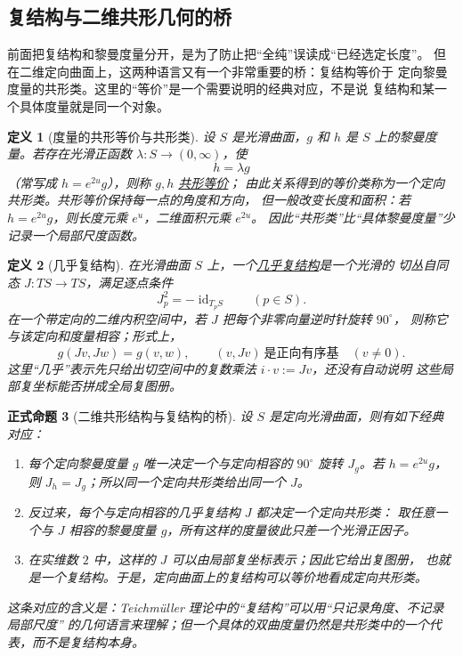 \documentclass[UTF8,fontset=none,a4paper,11pt]{ctexart}
\theoremstyle{foundation-definition}
\newtheorem{definition}{定义}[section]
\theoremstyle{foundation-theorem}
\theoremstyle{foundation-proposition}
\newtheorem{proposition}[definition]{正式命题}
\theoremstyle{foundation-example}
\theoremstyle{foundation-remark}
\theoremstyle{foundation-theorem}
\newcommand{\term}[2]{\hyperref[#1]{#2}}
\begin{document}
\subsection{复结构与二维共形几何的桥}

前面把复结构和黎曼度量分开，是为了防止把“全纯”误读成“已经选定长度”。
但在二维定向曲面上，这两种语言又有一个非常重要的桥：复结构等价于
定向黎曼度量的共形类。这里的“等价”是一个需要说明的经典对应，不是说
复结构和某一个具体度量就是同一个对象。

\begin{definition}[度量的共形等价与共形类]\label{def:conformal-metric-class}
设 \(S\) 是光滑曲面，\(g\) 和 \(h\) 是 \(S\) 上的黎曼度量。若存在光滑正函数
\(\lambda:S\to(0,\infty)\)，使
\[
h=\lambda g
\]
（常写成 \(h=e^{2u}g\)），则称 \(g,h\) \term{def:conformal-metric-class}{共形等价}；
由此关系得到的等价类称为一个定向共形类。共形等价保持每一点的角度和方向，
但一般改变长度和面积：若 \(h=e^{2u}g\)，则长度元乘 \(e^u\)，二维面积元乘 \(e^{2u}\)。
因此“共形类”比“具体黎曼度量”少记录一个局部尺度函数。
\end{definition}

\begin{definition}[几乎复结构]\label{def:almost-complex-structure}
在光滑曲面 \(S\) 上，一个\term{def:almost-complex-structure}{几乎复结构}是一个光滑的
切丛自同态 \(J:TS\to TS\)，满足逐点条件
\[
J_p^2=-\operatorname{id}_{T_pS}\qquad(p\in S).
\]
在一个带定向的二维内积空间中，若 \(J\) 把每个非零向量逆时针旋转 \(90^\circ\)，
则称它与该定向和度量相容；形式上，
\[
g(Jv,Jw)=g(v,w),
\qquad
(v,Jv)\ \text{是正向有序基}\quad(v\ne0).
\]
这里“几乎”表示先只给出切空间中的复数乘法 \(i\cdot v:=Jv\)，还没有自动说明
这些局部复坐标能否拼成全局复图册。
\end{definition}

\begin{proposition}[二维共形结构与复结构的桥]\label{prop:surface-conformal-complex-bridge}
设 \(S\) 是定向光滑曲面，则有如下经典对应：
\begin{enumerate}[label=(\arabic*)]
  \item 每个定向黎曼度量 \(g\) 唯一决定一个与定向相容的 \(90^\circ\) 旋转
    \(J_g\)。若 \(h=e^{2u}g\)，则 \(J_h=J_g\)；所以同一个定向共形类给出同一个 \(J\)。
  \item 反过来，每个与定向相容的几乎复结构 \(J\) 都决定一个定向共形类：
    取任意一个与 \(J\) 相容的黎曼度量 \(g\)，所有这样的度量彼此只差一个光滑正因子。
  \item 在实维数 \(2\) 中，这样的 \(J\) 可以由局部复坐标表示；因此它给出复图册，
    也就是一个复结构。于是，定向曲面上的复结构可以等价地看成定向共形类。
\end{enumerate}
这条对应的含义是：Teichmüller 理论中的“复结构”可以用“只记录角度、不记录局部尺度”
的几何语言来理解；但一个具体的双曲度量仍然是共形类中的一个代表，而不是复结构本身。
\end{proposition}
\end{document}
